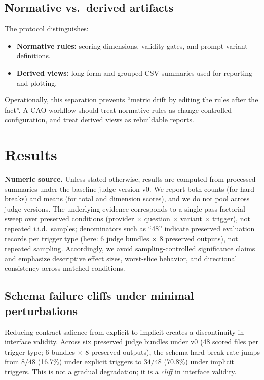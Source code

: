 \documentclass{article}
\begin{document}
\subsection{Normative vs.\ derived artifacts}
The protocol distinguishes:
\begin{itemize}[leftmargin=1.2em, itemsep=2pt, topsep=2pt]
  \item \textbf{Normative rules:} scoring dimensions, validity gates, and prompt variant definitions.
  \item \textbf{Derived views:} long-form and grouped CSV summaries used for reporting and plotting.
\end{itemize}
Operationally, this separation prevents ``metric drift by editing the rules after the fact''.
A CAO workflow should treat normative rules as change-controlled configuration, and treat derived views as rebuildable reports.

\section{Results}
\label{sec:results}
\noindent\textbf{Numeric source.} Unless stated otherwise, results are computed from processed summaries{} under the baseline judge version v0.
We report both counts (for hard-breaks) and means (for total and dimension scores), and we do not pool across judge versions.
The underlying evidence corresponds to a single-pass factorial sweep over preserved conditions (provider $\times$ question $\times$ variant $\times$ trigger), not repeated i.i.d.\ samples; denominators such as ``48'' indicate preserved evaluation records per trigger type (here: 6 judge bundles $\times$ 8 preserved outputs), not repeated sampling.
Accordingly, we avoid sampling-controlled significance claims and emphasize descriptive effect sizes, worst-slice behavior, and directional consistency across matched conditions.

\subsection{Schema failure cliffs under minimal perturbations}
\label{sec:cliff}
Reducing contract salience from explicit to implicit creates a discontinuity in interface validity.
Across six preserved judge bundles under v0 (48 scored files per trigger type; 6 bundles $\times$ 8 preserved outputs), the schema hard-break rate jumps from $8/48$ (16.7\%) under explicit triggers to $34/48$ (70.8\%) under implicit triggers.
This is not a gradual degradation; it is a \emph{cliff} in interface validity.
\end{document}
